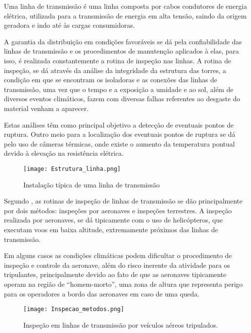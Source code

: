  Uma linha de transmissão é uma linha composta por cabos condutores de energia elétrica, utilizada para a transmissão de energia em alta tensão, saindo da origem geradora e indo até às cargas consumidoras.
 
 A garantia da distribuição em condições favoráveis se dá pela confiabilidade das linhas de transmissão e os procedimentos de manutenção aplicados à elas, para isso, é realizada constantemente a rotina de inspeção nas linhas. A rotina de inspeção, se dá através da análise da integridade da estrutura das torres, a condição em que se encontram os isoladoras e as conexões das linhas de transmissão, uma vez que o tempo e a exposição a umidade e ao sol, além de diversos eventos climáticos, fazem com diversas falhas referentes ao desgaste do material venham a aparecer. 
 
 Estas análises têm como principal objetivo a detecção de eventuais pontos de ruptura. Outro meio para a localização dos eventuais pontos de ruptura se dá pelo uso de câmeras térmicas, onde existe o aumento da temperatura pontual devido à elevação na resistência elétrica. 
 
 \begin{figure}[h!]												
 	\centering												
 	\texttt{[image: Estrutura\_linha.png]}			
 	\caption{Instalação típica de uma linha de transmissão}		
 	\label{img:Estrutura_Linha}	
 \end{figure}
 
 Segundo \cite{rangel2009sistema}, as rotinas de inspeção de linhas de transmissão se dão principalmente por dois métodos: inspeções por aeronaves e inspeções terrestres.
 A inspeção realizada por aeronaves, se dá tipicamente com o uso de helicópteros, que executam voos em baixa altitude, extremamente próximos das linhas de transmissão. 
 
 Em alguns casos as condições climáticas podem dificultar o procedimento de inspeção e controle da aeronave, além do risco inerente da atividade para os tripulantes, principalmente devido ao fato de que as aeronaves tipicamente operam na região de “homem-morto”, uma zona de altura que representa perigo para os operadores a bordo das aeronaves em caso de uma queda.
 
  \begin{figure}[h!]												
  	\centering												
  	\texttt{[image: Inspecao\_metodos.png]}			
  	\caption{Inspeção em linhas de transmissão por veículos aéreos tripulados.}		
  	\label{img:Inspecao_metodos}	
  \end{figure}
 
